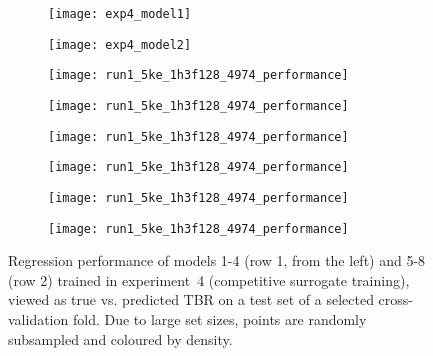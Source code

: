 \begin{figure}[h]
	\centering
	\begin{subfigure}[b]{0.25\textwidth}
		\centering
		\texttt{[image: exp4\_model1]}
	\end{subfigure}\hfill%
	\begin{subfigure}[b]{0.25\textwidth}
		\centering
		\texttt{[image: exp4\_model2]}
	\end{subfigure}\hfill%
	\begin{subfigure}[b]{0.25\textwidth}
		\centering
		\texttt{[image: run1\_5ke\_1h3f128\_4974\_performance]}
	\end{subfigure}\hfill%
	\begin{subfigure}[b]{0.25\textwidth}
		\centering
		\texttt{[image: run1\_5ke\_1h3f128\_4974\_performance]}
	\end{subfigure}

	\begin{subfigure}[b]{0.25\textwidth}
		\centering
		\texttt{[image: run1\_5ke\_1h3f128\_4974\_performance]}
	\end{subfigure}\hfill%
	\begin{subfigure}[b]{0.25\textwidth}
		\centering
		\texttt{[image: run1\_5ke\_1h3f128\_4974\_performance]}
	\end{subfigure}\hfill%
	\begin{subfigure}[b]{0.25\textwidth}
		\centering
		\texttt{[image: run1\_5ke\_1h3f128\_4974\_performance]}
	\end{subfigure}\hfill%
	\begin{subfigure}[b]{0.25\textwidth}
		\centering
		\texttt{[image: run1\_5ke\_1h3f128\_4974\_performance]}
	\end{subfigure}
	\caption{Regression performance of models 1-4 (row 1, from the left) and 5-8
		(row 2) trained in experiment~4 (competitive surrogate training), viewed
		as true vs. predicted TBR on a test set of a selected cross-validation
		fold. Due to large set sizes, points are randomly subsampled and coloured by density.}
	\label{fig:reg-performance}
\end{figure}

